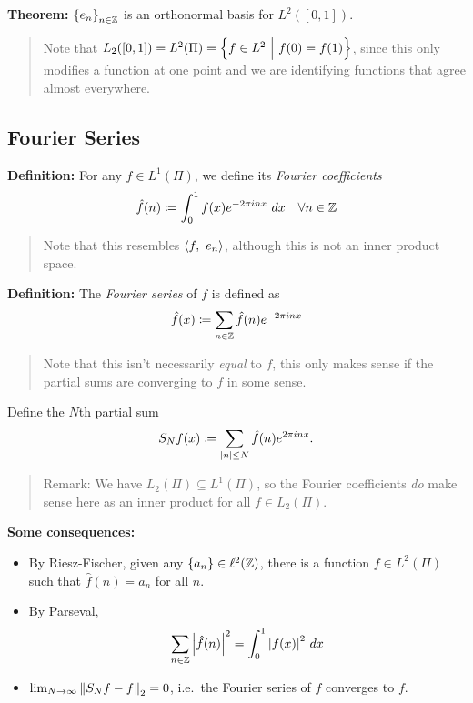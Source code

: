 \textbf{Theorem:} \(\left\{{e_n}\right\}_{n\in {\mathbb{Z}}}\) is an orthonormal basis
for \(L^2([0, 1])\).

\begin{quote}
Note that
\(L_2([0, 1]) = L^2(\Pi) = \left\{{f\in L^2 {~\mathrel{\Big|}~} f(0) = f(1)}\right\}\),
since this only modifies a function at one point and we are identifying
functions that agree almost everywhere.
\end{quote}

\hypertarget{fourier-series}{%
\subsection{Fourier Series}\label{fourier-series}}

\textbf{Definition:} For any \(f\in L^1(\Pi)\), we define its
\emph{Fourier coefficients}
\begin{align*}
\hat{f}(n) \coloneqq \int_0^1 f(x) e^{-2\pi i n x} ~dx \quad \forall n \in {\mathbb{Z}}
\end{align*}

\begin{quote}
Note that this resembles \({\left\langle {f},~{e_n} \right\rangle}\), although this is not an
inner product space.
\end{quote}

\textbf{Definition:} The \emph{Fourier series} of \(f\) is defined as
\begin{align*}
\hat f(x) \coloneqq \sum_{n\in {\mathbb{Z}}} \hat{f}(n) e^{-2\pi i n x}
\end{align*}

\begin{quote}
Note that this isn't necessarily \emph{equal} to \(f\), this only makes
sense if the partial sums are converging to \(f\) in some sense.
\end{quote}

Define the \(N\)th partial sum
\begin{align*}
S_Nf(x) \coloneqq \sum_{{\left\lvert {n} \right\rvert} \leq N} \hat{f}(n) e^{2\pi i n x}
.\end{align*}

\begin{quote}
Remark: We have \(L_2(\Pi) \subseteq L^1(\Pi)\), so the Fourier
coefficients \emph{do} make sense here as an inner product for all
\(f\in L_2(\Pi)\).
\end{quote}

\textbf{Some consequences:}

\begin{itemize}
\item
  By Riesz-Fischer, given any \(\left\{{a_n}\right\} \in \ell^2({\mathbb{Z}})\), there is
  a function \(f\in L^2(\Pi)\) such that \(\hat{f}(n) = a_n\) for all
  \(n\).
\item
  By Parseval,
  \begin{align*}
  \sum_{n\in {\mathbb{Z}}} {\left\lvert {\hat{f}(n)} \right\rvert}^2 = \int_0^1 {\left\lvert {f(x)} \right\rvert}^2~dx
  \end{align*}
\item
  \(\lim_{N\to\infty} {\left\lVert {S_Nf - f} \right\rVert}_2 = 0\), i.e.~the Fourier series
  of \(f\) converges to \(f\).
\end{itemize}

